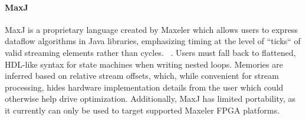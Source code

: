 
\paragraph{MaxJ}
MaxJ is a proprietary language created by Maxeler which allows users to express dataflow algorithms in Java libraries, emphasizing
timing at the level of ``ticks`` of valid streaming elements rather than cycles. ~\cite{maxeler}.
Users must fall back to flattened, HDL-like syntax for state machines when writing nested loops.
Memories are inferred based on relative stream offsets, which, while convenient for stream processing,
hides hardware implementation details from the user which could otherwise help drive optimization.
Additionally, MaxJ has limited portability, as it currently can only be used to target supported Maxeler FPGA platforms.



